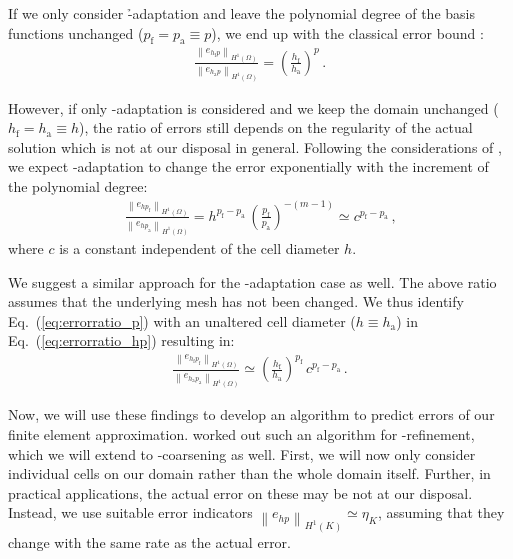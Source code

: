 If we only consider \h-adaptation and leave the polynomial degree of the basis functions unchanged ($p_\text{f} = p_\text{a} \equiv p$), we end up with the classical error bound \parencite{babuska1990}:
\begin{align}
\label{eq:errorratio_h} \frac{\left\|e_{h_\text{f} p}\right\|_{H^{1}(\Omega)}}{\left\|e_{h_\text{a} p}\right\|_{H^{1}(\Omega)}} = \left( \frac{h_\text{f}}{h_\text{a}} \right)^p \,\text{.}
\end{align}

However, if only \p-adaptation is considered and we keep the domain unchanged ($h_\text{f} = h_\text{a} \equiv h$), the ratio of errors still depends on the regularity of the actual solution which is not at our disposal in general. Following the considerations of \textcite{melenk2001}, we expect \p-adaptation to change the error exponentially with the increment of the polynomial degree:
\begin{align}
\label{eq:errorratio_p} \frac{\left\|e_{h p_\text{f}}\right\|_{H^{1}(\Omega)}}{\left\|e_{h p_\text{a}}\right\|_{H^{1}(\Omega)}} = h^{p_\text{f} - p_\text{a}} \, \left(\frac{p_\text{f}}{p_\text{a}}\right)^{-(m-1)} \simeq c^{p_\text{f} - p_\text{a}} \,\text{,}
\end{align}
where $c$ is a constant independent of the cell diameter $h$.

We suggest a similar approach for the \hp-adaptation case as well. The above ratio assumes that the underlying mesh has not been changed. We thus identify Eq.~(\ref{eq:errorratio_p}) with an unaltered cell diameter ($h \equiv h_\text{a}$) in Eq.~(\ref{eq:errorratio_hp}) resulting in:
\begin{align}
\label{eq:errorratio_hp_exp} \frac{\left\|e_{h_\text{f} p_\text{f}}\right\|_{H^{1}(\Omega)}}{\left\|e_{h_\text{a} p_\text{a}}\right\|_{H^{1}(\Omega)}} \simeq \left( \frac{h_\text{f}}{h_\text{a}} \right)^{p_\text{f}} \, c^{p_\text{f} - p_\text{a}} \,\text{.}
\end{align}

Now, we will use these findings to develop an algorithm to predict errors of our finite element approximation. \textcite{melenk2001} worked out such an algorithm for \hp-refinement, which we will extend to \hp-coarsening as well. First, we will now only consider individual cells on our domain rather than the whole domain itself. Further, in practical applications, the actual error on these may be not at our disposal. Instead, we use suitable error indicators $\left\|e_{hp}\right\|_{H^{1}(K)} \simeq \eta_K$, assuming that they change with the same rate as the actual error.

